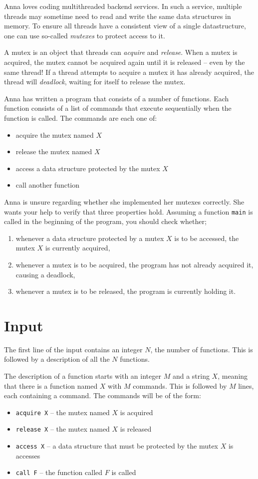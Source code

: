 Anna loves coding multithreaded backend services.
In such a service, multiple threads may sometime need to read and write the same data structures in memory.
To ensure all threads have a consistent view of a single datastructure, one can use so-called \emph{mutexes} to protect access to it.

A mutex is an object that threads can \emph{acquire} and \emph{release}.
When a mutex is acquired, the mutex cannot be acquired again until it is released -- even by the same thread!
If a thread attempts to acquire a mutex it has already acquired, the thread will \emph{deadlock}, waiting for itself to release the mutex.

Anna has written a program that consists of a number of functions.
Each function consists of a list of commands that execute sequentially when the function is called.
The commands are each one of:
\begin{itemize}
  \item acquire the mutex named $X$
  \item release the mutex named $X$
  \item access a data structure protected by the mutex $X$
  \item call another function
\end{itemize}

Anna is unsure regarding whether she implemented her mutexes correctly.
She wants your help to verify that three properties hold.
Assuming a function \texttt{main} is called in the beginning of the program, you should check whether;
\begin{enumerate}
  \item whenever a data structure protected by a mutex $X$ is to be accessed, the mutex $X$ is currently acquired,
  \item whenever a mutex is to be acquired, the program has not already acquired it, causing a deadlock,
  \item whenever a mutex is to be released, the program is currently holding it.
\end{enumerate}

\section*{Input}
The first line of the input contains an integer $N$, the number of functions.
This is followed by a description of all the $N$ functions.

The description of a function starts with an integer $M$ and a string $X$, meaning that there is a function named $X$ with $M$ commands.
This is followed by $M$ lines, each containing a command.
The commands will be of the form:
\begin{itemize}
  \item \texttt{acquire X} -- the mutex named $X$ is acquired
  \item \texttt{release X} -- the mutex named $X$ is released
  \item \texttt{access X} -- a data structure that must be protected by the mutex $X$ is accesses
  \item \texttt{call F} -- the function called $F$ is called
\end{itemize}

